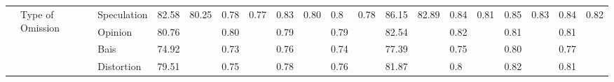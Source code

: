 \begin{table}[!tbh]
{\begin{tabular}{l|l|l|llllllll||llllllll}
 & \multirow{5}{*}{Type of Omission}     & Speculation             & \multicolumn{1}{l|}{82.58} & \multicolumn{1}{l|}{\multirow{5}{*}{80.25}} & \multicolumn{1}{l|}{0.78} & \multicolumn{1}{l|}{\multirow{5}{*}{0.77}} & \multicolumn{1}{l|}{0.83} & \multicolumn{1}{l|}{\multirow{5}{*}{0.80}} & \multicolumn{1}{l|}{0.8}  & \multirow{5}{*}{0.78} & \multicolumn{1}{l|}{86.15} & \multicolumn{1}{l|}{\multirow{5}{*}{82.89}} & \multicolumn{1}{l|}{0.84} & \multicolumn{1}{l|}{\multirow{5}{*}{0.81}} & \multicolumn{1}{l|}{0.85} & \multicolumn{1}{l|}{\multirow{5}{*}{0.83}} & \multicolumn{1}{l|}{0.84} & \multirow{5}{*}{0.82} \\ \cline{3-4} \cline{6-6} \cline{8-8} \cline{10-10} \cline{12-12} \cline{14-14} \cline{16-16} \cline{18-18}
                       &                                 & Opinion                 & \multicolumn{1}{l|}{80.76} & \multicolumn{1}{l|}{}                       & \multicolumn{1}{l|}{0.80} & \multicolumn{1}{l|}{}                      & \multicolumn{1}{l|}{0.79} & \multicolumn{1}{l|}{}                      & \multicolumn{1}{l|}{0.79} &                       & \multicolumn{1}{l|}{82.54} & \multicolumn{1}{l|}{}                       & \multicolumn{1}{l|}{0.82} & \multicolumn{1}{l|}{}                      & \multicolumn{1}{l|}{0.81} & \multicolumn{1}{l|}{}                      & \multicolumn{1}{l|}{0.81} &                       \\ \cline{3-4} \cline{6-6} \cline{8-8} \cline{10-10} \cline{12-12} \cline{14-14} \cline{16-16} \cline{18-18}
                       &                                 & Bais                    & \multicolumn{1}{l|}{74.92} & \multicolumn{1}{l|}{}                       & \multicolumn{1}{l|}{0.73} & \multicolumn{1}{l|}{}                      & \multicolumn{1}{l|}{0.76} & \multicolumn{1}{l|}{}                      & \multicolumn{1}{l|}{0.74} &                       & \multicolumn{1}{l|}{77.39} & \multicolumn{1}{l|}{}                       & \multicolumn{1}{l|}{0.75} & \multicolumn{1}{l|}{}                      & \multicolumn{1}{l|}{0.80} & \multicolumn{1}{l|}{}                      & \multicolumn{1}{l|}{0.77} &                       \\ \cline{3-4} \cline{6-6} \cline{8-8} \cline{10-10} \cline{12-12} \cline{14-14} \cline{16-16} \cline{18-18}
                       &                                 & Distortion              & \multicolumn{1}{l|}{79.51} & \multicolumn{1}{l|}{}                       & \multicolumn{1}{l|}{0.75} & \multicolumn{1}{l|}{}                      & \multicolumn{1}{l|}{0.78} & \multicolumn{1}{l|}{}                      & \multicolumn{1}{l|}{0.76} &                       & \multicolumn{1}{l|}{81.87} & \multicolumn{1}{l|}{}                       & \multicolumn{1}{l|}{0.8}  & \multicolumn{1}{l|}{}                      & \multicolumn{1}{l|}{0.82} & \multicolumn{1}{l|}{}                      & \multicolumn{1}{l|}{0.81} &                       \\ \cline{3-4} \cline{6-6} \cline{8-8} \cline{10-10} \cline{12-12} \cline{14-14} \cline{16-16} \cline{18-18}

\end{tabular}}
\end{table}
